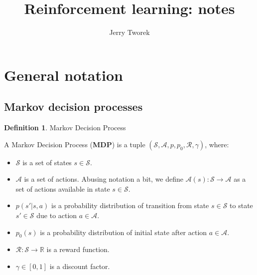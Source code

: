 \documentclass[10pt]{article}
\title{Reinforcement learning: notes}
\author{Jerry Tworek}
\date{\vspace{-5ex}}
\numberwithin{equation}{subsection}
\newcommand{\MS}{\ensuremath{\mathcal{S}}}
\newcommand{\MA}{\ensuremath{\mathcal{A}}}
\newcommand{\Mp}{\ensuremath{p}}
\newcommand{\Mpz}{\ensuremath{p_0}}
\newcommand{\MR}{\ensuremath{\mathcal{R}}}
\newcommand{\R}{\ensuremath{\mathbb{R}}}
\newcommand{\ra}{\ensuremath{\rightarrow}}
\newcommand{\mdp}{\textbf{MDP}\xspace}
\theoremstyle{plain}
\theoremstyle{definition}
\newtheorem{definition}{Definition}[subsection]
\begin{document}
\begin{titlepage}
\maketitle
\tableofcontents{}
\end{titlepage}

\section{General notation}

\subsection{Markov decision processes}

\begin{definition}{Markov Decision Process}

\begin{sloppypar}
A Markov Decision Process (\mdp) is a tuple $(\MS, \MA, \Mp, \Mpz, \MR, \gamma)$, where:
\end{sloppypar}

\begin{itemize}
\item $\MS$ is a set of states $s \in \MS$.
\item $\MA$ is a set of actions. Abusing notation a bit, we define 
$\MA(s) : \MS \ra \MA$ as a set of actions available in state $s \in \MS$.
\item $\Mp(s' | s, a)$ is a probability distribution of transition from state $s \in \MS$ to state 
$s' \in \MS$ due to action $a \in \MA$.
\item $\Mpz(s)$ is a probability distribution of initial state
after action $a \in \MA$.
\item $\MR : \MS \ra \R$ is a reward function.
\item $\gamma \in \left[0,1\right]$ is a discount factor.
\end{itemize}
\end{definition}
\end{document}
